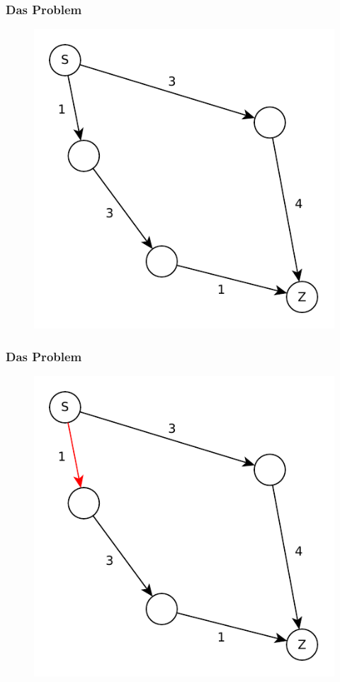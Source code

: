\begin{frame}
\frametitle{Das Problem}
\begin{figure}
\includegraphics[scale=.8]{dijkstra_graphs/bfs_fail_0.pdf}
\end{figure}
\end{frame}

\begin{frame}
\frametitle{Das Problem}
\begin{figure}
\includegraphics[scale=.8]{dijkstra_graphs/bfs_fail_1.pdf}
\end{figure}
\end{frame}

